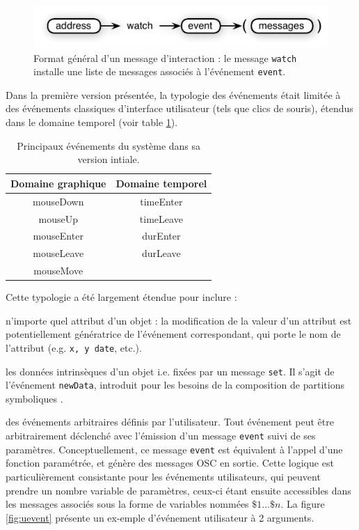 \documentclass{article}
\newcommand{\OSC}[1]	{{\fontsize{9pt}{9pt} \selectfont\texttt{#1}}}
\let\olditemize\itemize
\let\oldenditemize\enditemize
\renewenvironment{itemize} 	{\olditemize \renewcommand{\labelitemi}{$\bullet$} \setlength{\itemsep}{0mm}}{\oldenditemize}
\begin{document}
\begin{figure}[htbp]
\centerline{
	\includegraphics[width=0.95\columnwidth]{imgs/watch}}
\caption{Format général d'un message d'interaction : le message \OSC{watch} installe une liste de messages associés à l'événement \OSC{event}.}
\label{fig:watch}
\end{figure}


Dans la première version présentée, la typologie des événements était limitée à des événements classiques d'interface utilisateur (tels que clics de souris), étendus dans le domaine temporel (voir table \ref{tbl:evts}). 

\begin{table}[htp]
\begin{center}
\begin{tabular}{c|c}
Domaine graphique & Domaine temporel \\
\hline
mouseDown 		& timeEnter	\\
mouseUp			& timeLeave	\\
mouseEnter		& durEnter		\\
mouseLeave		& durLeave		\\
mouseMove		&				\\
\end{tabular}
\end{center}
\caption{Principaux événements du système dans sa version intiale.}
\label{tbl:evts}
\end{table}%

Cette typologie a été largement étendue pour inclure :
\begin{itemize}
\item n'importe quel attribut d'un objet : la modification de la valeur d'un attribut est potentiellement génératrice de l'événement correspondant, qui porte le nom de l'attribut (e.g. \OSC{x, y date}, etc.). 
\item les données intrinsèques d'un objet i.e. fixées par un message \OSC{set}. Il s'agit de l'événement \OSC{newData}, introduit pour les besoins de la composition de partitions symboliques \cite{lepetit16}.
\item des événements arbitraires définis par l'utilisateur.
\end{itemize}
\vspace*{1mm}
Tout événement peut être arbitrairement déclenché avec l'émission d'un message \OSC{event} suivi de ses paramètres. Conceptuellement, ce message \OSC{event} est équivalent à l'appel d'une fonction paramétrée, et génère des messages OSC en sortie. 
Cette logique est particulièrement consistante pour les événements utilisateurs, qui peuvent prendre un nombre variable de paramètres, ceux-ci étant ensuite accessibles dans les messages associés sous la forme de variables nommées $\$1...\$n$. La figure \ref{fig:uevent} présente un ex-emple d'événement utilisateur à 2 arguments.
\end{document}

